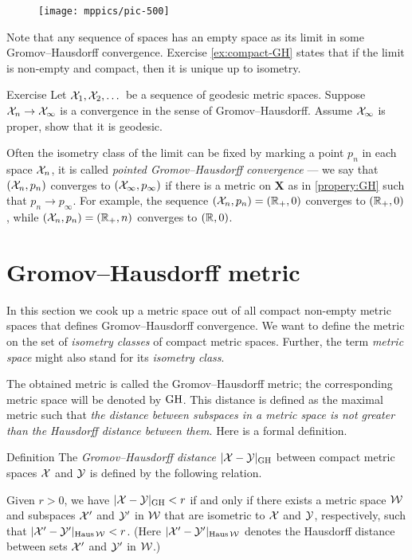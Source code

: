 \begin{figure}[ht!]
\vskip-0mm
\centering
\texttt{[image: mppics/pic-500]}
\end{figure}

Note that any sequence of spaces has an empty space as its limit in some  Gromov--Hausdorff convergence.
Exercise \ref{ex:compact-GH} states that if the limit is non-empty and compact, then it is unique up to isometry. 

\begin{thm}{Exercise}\label{ex:geod-closed}
Let $\mathcal{X}_1,\mathcal{X}_2,\dots$ be a sequence of geodesic metric spaces.
Suppose $\mathcal{X}_n\to \mathcal{X}_\infty$ is a convergence in the sense of Gromov--Hausdorff.
Assume $\mathcal{X}_\infty$ is proper, show that it is geodesic.
\end{thm}

Often the isometry class of the limit can be fixed by marking a point $p_n$ in each space $\mathcal{X}_n$, it is called \emph{pointed Gromov--Hausdorff convergence} --- we say that $(\mathcal{X}_n,p_n)$ converges to $(\mathcal{X}_\infty,p_\infty)$ if there is a metric on $\bm{X}$ as in \ref{propery:GH} such that $p_n\to p_\infty$.
For example, the sequence $(\mathcal{X}_n,p_n)=(\mathbb{R}_+,0)$ converges to $(\mathbb{R}_+,0)$, while $(\mathcal{X}_n,p_n)=(\mathbb{R}_+,n)$ converges to $(\mathbb{R},0)$.

\section{Gromov--Hausdorff metric}\label{sec:Gromov--Hausdorff-metric}

In this section we cook up a metric space out of all compact non-empty metric spaces
that defines Gromov--Hausdorff convergence.
We want to define the metric on the set of \textit{isometry classes} of compact metric spaces.
Further, the term \textit{metric space} might also stand for its \textit{isometry class}.

The obtained metric is called the Gromov--Hausdorff metric;
the corresponding metric space will be denoted by $\operatorname{\rm GH}\nolimits$.
This distance is defined as the maximal metric such that \textit{the distance between subspaces in a metric space is not greater than the Hausdorff distance between them}.
Here is a formal definition.

\begin{thm}{Definition}\label{def:GH}
The \emph{Gromov--Hausdorff distance} $|\mathcal{X}-\mathcal{Y}|_{\operatorname{\rm GH}\nolimits}$ between compact metric spaces $\mathcal{X}$ and $\mathcal{Y}$
is defined by the following
relation.
 
Given  $r > 0$, we have $|\mathcal{X}-\mathcal{Y}|_{\operatorname{\rm GH}\nolimits} < r$ if and only if there exists a metric
space $\mathcal{W}$ and subspaces $\mathcal{X}'$ and $\mathcal{Y}'$ in $\mathcal{W}$ that are isometric to $\mathcal{X}$ and $\mathcal{Y}$,
respectively, such that $|\mathcal{X}'-\mathcal{Y}'|_{\operatorname{\rm Haus}\nolimits\mathcal{W}} < r$. 
(Here $|\mathcal{X}'-\mathcal{Y}'|_{\operatorname{\rm Haus}\nolimits\mathcal{W}}$ denotes the Hausdorff distance between sets $\mathcal{X}'$ and $\mathcal{Y}'$ in $\mathcal{W}$.)
\end{thm}

